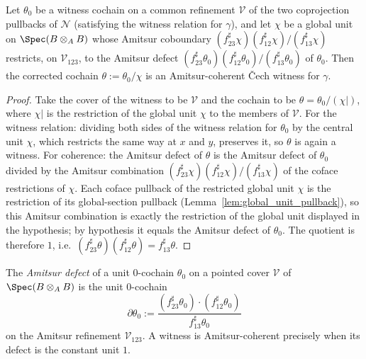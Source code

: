 \begin{lemma}
  \label{lem:nonempty_of_defect_eq_coboundary}
  \leanok
  Let \(\theta_0\) be a witness cochain on a common refinement \(\mathcal V\) of the two
  coprojection pullbacks of \(\mathcal N\) (satisfying the witness relation for \(\gamma\)), and
  let \(\chi\) be a global unit on \(\Spec(B \otimes_A B)\) whose Amitsur coboundary
  \((f_{23}^{\sharp}\chi)(f_{12}^{\sharp}\chi)/(f_{13}^{\sharp}\chi)\) restricts, on
  \(\mathcal V_{123}\), to the Amitsur defect
  \((f_{23}^{\sharp}\theta_0)(f_{12}^{\sharp}\theta_0)/(f_{13}^{\sharp}\theta_0)\) of
  \(\theta_0\). Then the corrected cochain \(\theta := \theta_0/\chi\) is an Amitsur-coherent
  \v Cech witness for \(\gamma\).
\end{lemma}
\begin{proof}
  \leanok
  Take the cover of the witness to be \(\mathcal V\) and the cochain to be
  \(\theta = \theta_0/(\chi|)\), where \(\chi|\) is the restriction of the global unit \(\chi\)
  to the members of \(\mathcal V\). For the witness relation: dividing both sides of the
  witness relation for \(\theta_0\) by the central unit \(\chi\), which restricts the same way
  at \(x\) and \(y\), preserves it, so \(\theta\) is again a witness. For coherence: the Amitsur
  defect of \(\theta\) is the Amitsur defect of \(\theta_0\) divided by the Amitsur combination
  \((f_{23}^{\sharp}\chi)(f_{12}^{\sharp}\chi)/(f_{13}^{\sharp}\chi)\) of the coface restrictions
  of \(\chi\). Each coface pullback of the restricted global unit \(\chi\) is the restriction of
  its global-section pullback (Lemma~\ref{lem:global_unit_pullback}), so this Amitsur
  combination is exactly the restriction of the global unit displayed in the hypothesis; by
  hypothesis it equals the Amitsur defect of \(\theta_0\). The quotient is therefore \(1\),
  i.e.\ \((f_{23}^{\sharp}\theta)(f_{12}^{\sharp}\theta) = f_{13}^{\sharp}\theta\).
\end{proof}

\begin{definition}
  \label{def:defectCochain}
  \leanok
  The \emph{Amitsur defect} of a unit \(0\)-cochain \(\theta_0\) on a pointed cover
  \(\mathcal V\) of \(\Spec(B \otimes_A B)\) is the unit \(0\)-cochain
  \[
    \partial\theta_0 :=
      \frac{(f_{23}^{\sharp}\theta_0) \cdot (f_{12}^{\sharp}\theta_0)}{f_{13}^{\sharp}\theta_0}
  \]
  on the Amitsur refinement \(\mathcal V_{123}\). A witness is Amitsur-coherent precisely when
  its defect is the constant unit \(1\).
\end{definition}

